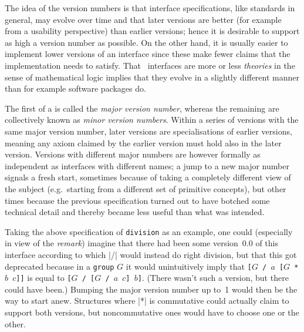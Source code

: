 \documentclass{mtmtcl}
\theoremstyle{plain}
\theoremstyle{remark}
\begin{document}
The idea of the version numbers is that interface specifications, like 
standards in general, may evolve over time and that later versions 
are better (for example from a usability perspective) than earlier 
versions; hence it is desirable to support as high a version number 
as possible. On the other hand, it is usually easier to implement 
lower versions of an interface since these make fewer claims that the 
implementation needs to satisfy. That \mtl\ interfaces are more or less 
\emph{theories} in the sense of mathematical logic implies that they 
evolve in a slightly different manner than for example software 
packages do.

The first  of a  is called the 
\emph{major version number}, whereas the remaining are collectively 
known as \emph{minor version numbers}. Within a series of versions 
with the same major version number, later versions are 
specialisations of earlier versions, meaning any axiom claimed by the 
earlier version must hold also in the later version. Versions with 
different major numbers are however formally as independent as 
interfaces with different names; a jump to a new major number signals 
a fresh start, sometimes because of taking a completely different 
view of the subject (e.g.~starting from a different set of primitive 
concepts), but other times because the previous specification turned 
out to have botched some technical detail and thereby became less 
useful than what was intended.

Taking the above specification of \texttt{division} as an example, 
one could (especially in view of the \emph{remark}) imagine that there 
had been some version~0.0 of this interface according to which |/| 
would instead do right division, but that this got deprecated because 
in a \texttt{group} $G$ it would unintuitively imply that 
\texttt{[$G$ / $a$ [$G$ * $b$ $c$]]} is equal to 
\texttt{[$G$ / [$G$ / $a$ $c$] $b$]}. (There wasn't such a version, 
but there could have been.) Bumping the major version number up to~1 
would then be the way to start anew. Structures where |*| is 
commutative could actually claim to support both versions, but 
noncommutative ones would have to choose one or the other.
\end{document}
